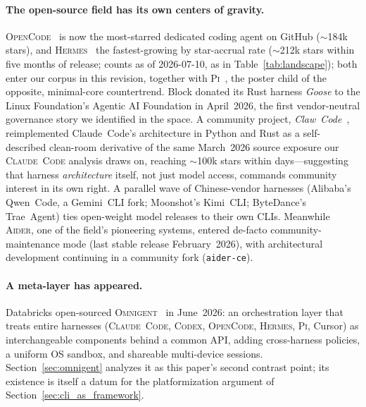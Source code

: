 \documentclass[11pt,a4paper]{article}
\newcommand{\clcode}{\textsc{Claude~Code}\xspace}
\newcommand{\cdx}{\textsc{Codex}\xspace}
\newcommand{\adr}{\textsc{Aider}\xspace}
\newcommand{\hrm}{\textsc{Hermes}\xspace}
\newcommand{\pib}{\textsc{Pi}\xspace}
\newcommand{\ocd}{\textsc{OpenCode}\xspace}
\newcommand{\omni}{\textsc{Omnigent}\xspace}
\begin{document}
\paragraph{The open-source field has its own centers of gravity.}
\ocd{}~\cite{opencode2026} is now the most-starred dedicated coding agent on GitHub ($\sim$184k stars), and \hrm{}~\cite{hermes2026} the fastest-growing by star-accrual rate ($\sim$212k stars within five months of release; counts as of 2026-07-10, as in Table~\ref{tab:landscape}); both enter our corpus in this revision, together with \pib{}~\cite{pi2026}, the poster child of the opposite, minimal-core countertrend.
Block donated its Rust harness \emph{Goose} to the Linux Foundation's Agentic AI Foundation in April~2026, the first vendor-neutral governance story we identified in the space.
A community project, \emph{Claw~Code}~\cite{clawcode2026}, reimplemented Claude~Code's architecture in Python and Rust as a self-described clean-room derivative of the same March~2026 source exposure our \clcode{} analysis draws on, reaching $\sim$100k stars within days---suggesting that harness \emph{architecture} itself, not just model access, commands community interest in its own right.
A parallel wave of Chinese-vendor harnesses (Alibaba's Qwen~Code, a Gemini~CLI fork; Moonshot's Kimi~CLI; ByteDance's Trae~Agent) ties open-weight model releases to their own CLIs.
Meanwhile \adr{}, one of the field's pioneering systems, entered de-facto community-maintenance mode (last stable release February~2026), with architectural development continuing in a community fork (\texttt{aider-ce}).

\paragraph{A meta-layer has appeared.}
Databricks open-sourced \omni{}~\cite{omnigent2026} in June~2026: an orchestration layer that treats entire harnesses (\clcode{}, \cdx{}, \ocd{}, \hrm{}, \pib{}, Cursor) as interchangeable components behind a common API, adding cross-harness policies, a uniform OS sandbox, and shareable multi-device sessions.
Section~\ref{sec:omnigent} analyzes it as this paper's second contrast point; its existence is itself a datum for the platformization argument of Section~\ref{sec:cli_as_framework}.
\end{document}
